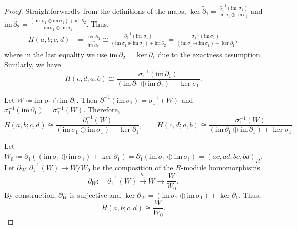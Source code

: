 \documentclass[aps,prl,english,superscriptaddress,twocolumn,tightenlines,showpacs,longbibliography,floatfix,amsfonts]{revtex4-2}
\begin{document}
\begin{proof}
	Straightforwardly from the definitions of the maps, $\ker\tilde{\partial}_{1}=\frac{\partial_{1}^{-1}\left(\text{im }\sigma_{1}\right)}{\text{im}\,\sigma_{1}\oplus\text{im}\,\sigma_{1}}$
	and $\text{im}\,\tilde{\partial}_{2}=\frac{\left(\text{im }\sigma_{1}\oplus\text{im}\,\sigma_{1}\right)+\text{im}\,\partial_{2}}{\text{im}\,\sigma_{1}\oplus\text{im}\,\sigma_{1}}$.
	Thus, 
	\begin{align}
		H\left(a,b;c,d\right) & =\frac{\ker\tilde{\partial}_{1}}{\text{im}\,\tilde{\partial}_{2}}\cong\frac{\partial_{1}^{-1}\left(\text{im }\sigma_{1}\right)}{\left(\text{im}\,\sigma_{1}\oplus\text{im}\,\sigma_{1}\right)+\text{im}\,\partial_{2}}=\frac{\sigma_{1}^{-1}\left(\text{im}\,\sigma_{1}\right)}{\left(\text{im}\,\sigma_{1}\oplus\text{im}\,\sigma_{1}\right)+\ker\partial_{1}},\label{eq:K1-1}
	\end{align}
	where in the last equality we use $\text{im}\,\partial_{2}=\ker\partial_{1}$
	due to the exactness assumption. Similarly, we have 
	\begin{equation}
		H\left(c,d;a,b\right)\cong\frac{\sigma_{1}^{-1}\left(\text{im}\,\partial_{1}\right)}{\left(\text{im}\,\partial_{1}\oplus\text{im}\,\partial_{1}\right)+\ker\sigma_{1}}.
	\end{equation}
	
	Let $W\coloneqq\text{im }\sigma_{1}\cap\text{im }\partial_{1}$. Then
	$\partial_{1}^{-1}\left(\text{im}\,\sigma_{1}\right)=\sigma_{1}^{-1}\left(W\right)$
	and $\sigma_{1}^{-1}\left(\text{im}\,\partial_{1}\right)=\sigma_{1}^{-1}\left(W\right)$.
	Therefore,
	\begin{equation}
		H\left(a,b;c,d\right)\cong\frac{\partial_{1}^{-1}\left(W\right)}{\left(\text{im}\,\sigma_{1}\oplus\text{im}\,\sigma_{1}\right)+\ker\partial_{1}},\qquad H\left(c,d;a,b\right)\cong\frac{\sigma_{1}^{-1}\left(W\right)}{\left(\text{im}\,\partial_{1}\oplus\text{im}\,\partial_{1}\right)+\ker\sigma_{1}}.
	\end{equation}
	
	Let $W_{0}\coloneqq\partial_{1}\left(\left(\text{im}\,\sigma_{1}\oplus\text{im}\,\sigma_{1}\right)+\ker\partial_{1}\right)=\partial_{1}\left(\text{im}\,\sigma_{1}\oplus\text{im}\,\sigma_{1}\right)=\left(ac,ad,bc,bd\right)_{R}$.
	Let $\partial_{W}:\partial_{1}^{-1}\left(W\right)\rightarrow W/W_{0}$
	be the composition of the $R$-module homomorphisms
	\begin{equation}
		\partial_{W}:\quad\partial_{1}^{-1}\left(W\right)\xrightarrow{\partial_{1}}W\rightarrow\frac{W}{W_{0}}.
	\end{equation}
	By construction, $\partial_{W}$ is surjective and $\ker\partial_{W}=\left(\text{im}\,\sigma_{1}\oplus\text{im}\,\sigma_{1}\right)+\ker\partial_{1}$.
	Thus, 
	\begin{equation}
		H\left(a,b;c,d\right)\cong\frac{W}{W_{0}}.
	\end{equation}
	

\end{proof}
\end{document}
